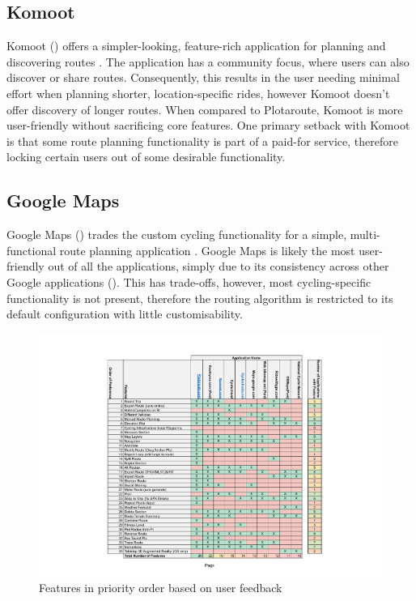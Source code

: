 \subsection{Komoot}
\label{litrev:komoot}
Komoot (\cite{noauthor_komoot_nodate}) offers a simpler-looking, feature-rich application for planning and discovering routes . The application has a community focus, where users can also discover or share routes. Consequently, this results in the user needing minimal effort when planning shorter, location-specific rides, however Komoot doesn't offer discovery of longer routes. When compared to Plotaroute, Komoot is more user-friendly without sacrificing core features. One primary setback with Komoot is that some route planning functionality is part of a paid-for service, therefore locking certain users out of some desirable functionality.

\subsection{Google Maps}
\label{litrev:gmaps}

Google Maps (\cite{noauthor_google_nodate}) trades the custom cycling functionality for a simple, multi-functional route planning application . Google Maps is likely the most user-friendly out of all the applications, simply due to its consistency across other Google applications (\cite{noauthor_material_nodate}). This has trade-offs, however, most cycling-specific functionality is not present, therefore the routing algorithm is restricted to its default configuration with little customisability.

\label{fig:research-results}
\begin{figure}[h!]
    \centering
    \includegraphics[width=1\linewidth]{figures/current_apps_post_research.pdf}
    \caption{Features in priority order based on user feedback}
    \label{fig:features}
\end{figure}

